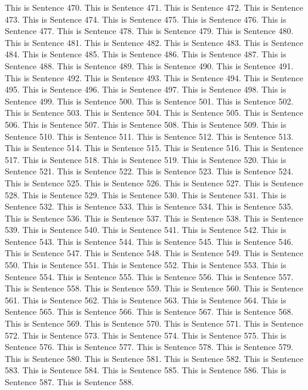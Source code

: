 \documentclass{article}
\begin{document}
This is Sentence 470.
This is Sentence 471.
This is Sentence 472.
This is Sentence 473.
This is Sentence 474.
This is Sentence 475.
This is Sentence 476.
This is Sentence 477.
This is Sentence 478.
This is Sentence 479.
This is Sentence 480.
This is Sentence 481.
This is Sentence 482.
This is Sentence 483.
This is Sentence 484.
This is Sentence 485.
This is Sentence 486.
This is Sentence 487.
This is Sentence 488.
This is Sentence 489.
This is Sentence 490.
This is Sentence 491.
This is Sentence 492.
This is Sentence 493.
This is Sentence 494.
This is Sentence 495.
This is Sentence 496.
This is Sentence 497.
This is Sentence 498.
This is Sentence 499.
This is Sentence 500.
This is Sentence 501.
This is Sentence 502.
This is Sentence 503.
This is Sentence 504.
This is Sentence 505.
This is Sentence 506.
This is Sentence 507.
This is Sentence 508.
This is Sentence 509.
This is Sentence 510.
This is Sentence 511.
This is Sentence 512.
This is Sentence 513.
This is Sentence 514.
This is Sentence 515.
This is Sentence 516.
This is Sentence 517.
This is Sentence 518.
This is Sentence 519.
This is Sentence 520.
This is Sentence 521.
This is Sentence 522.
This is Sentence 523.
This is Sentence 524.
This is Sentence 525.
This is Sentence 526.
This is Sentence 527.
This is Sentence 528.
This is Sentence 529.
This is Sentence 530.
This is Sentence 531.
This is Sentence 532.
This is Sentence 533.
This is Sentence 534.
This is Sentence 535.
This is Sentence 536.
This is Sentence 537.
This is Sentence 538.
This is Sentence 539.
This is Sentence 540.
This is Sentence 541.
This is Sentence 542.
This is Sentence 543.
This is Sentence 544.
This is Sentence 545.
This is Sentence 546.
This is Sentence 547.
This is Sentence 548.
This is Sentence 549.
This is Sentence 550.
This is Sentence 551.
This is Sentence 552.
This is Sentence 553.
This is Sentence 554.
This is Sentence 555.
This is Sentence 556.
This is Sentence 557.
This is Sentence 558.
This is Sentence 559.
This is Sentence 560.
This is Sentence 561.
This is Sentence 562.
This is Sentence 563.
This is Sentence 564.
This is Sentence 565.
This is Sentence 566.
This is Sentence 567.
This is Sentence 568.
This is Sentence 569.
This is Sentence 570.
This is Sentence 571.
This is Sentence 572.
This is Sentence 573.
This is Sentence 574.
This is Sentence 575.
This is Sentence 576.
This is Sentence 577.
This is Sentence 578.
This is Sentence 579.
This is Sentence 580.
This is Sentence 581.
This is Sentence 582.
This is Sentence 583.
This is Sentence 584.
This is Sentence 585.
This is Sentence 586.
This is Sentence 587.
This is Sentence 588.
\end{document}
